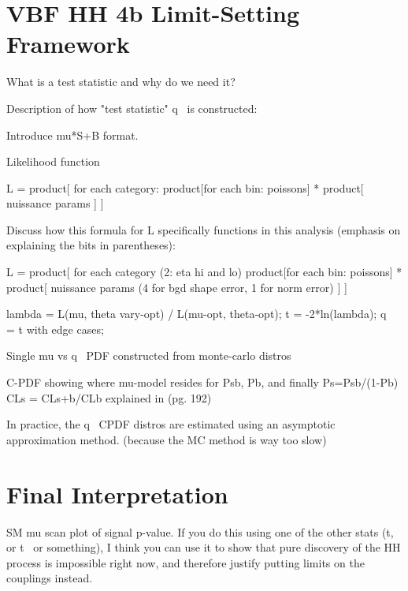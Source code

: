 \section{VBF \to HH \to 4b Limit-Setting Framework}

    What is a test statistic and why do we need it?

    Description of how "test statistic" q~ is constructed:

    Introduce mu*S+B format.

    Likelihood function

        L = product[ for each category:
            product[for each bin: poissons]
            * product[ nuissance params ] 
        ]


    Discuss how this formula for L specifically functions in this analysis
        (emphasis on explaining the bits in parentheses):

        L = product[ for each category (2: eta hi and lo) 
            product[for each bin: poissons]
            * product[ nuissance params (4 for bgd shape error, 1 for norm error) ] 
        ]
        
    lambda = L(mu, theta vary-opt) / L(mu-opt, theta-opt);
    t = -2*ln(lambda);
    q~ = t with edge cases;

    Single mu vs q~ PDF constructed from monte-carlo distros

    C-PDF showing where mu-model resides for Psb, Pb, and finally Ps=Psb/(1-Pb)
    CLs = CLs+b/CLb explained in \cite{Barlow:2019svl} (pg. 192)

    In practice, the q~ CPDF distros are estimated using an asymptotic approximation method\cite{asymptotic_formulae_for_likelihood}.
    (because the MC method is way too slow)

    

\section{Final Interpretation}

SM mu scan plot of signal p-value.
If you do this using one of the other stats (t, or t~ or something),
    I think you can use it to show that pure discovery of the HH process is impossible right now,
    and therefore justify putting limits on the couplings instead.

